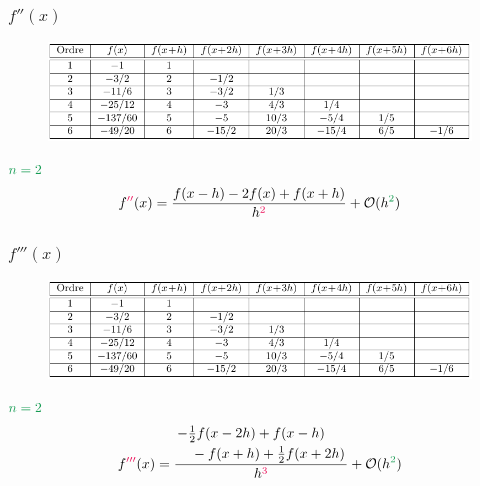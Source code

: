 \documentclass[]{article}
\begin{document}
\begin{multicols}{3}
\subsubsection{$f''(x)$}
\begin{figure}[H]
\centering
\includegraphics[width=\columnwidth,page=6]{diff_finies_tableaux.pdf}
\end{figure}
$\textcolor{ForestGreen}{n=2}$
$$f\textcolor{OrangeRed}{''}(x)=\frac{f(x-h)-2f(x)+f(x+h)}{h^{\textcolor{OrangeRed}{2}}}+\mathcal{O}(h^{\textcolor{ForestGreen}{2}})$$
\subsubsection{$f'''(x)$}
\begin{figure}[H]
\centering
\includegraphics[width=\columnwidth,page=7]{diff_finies_tableaux.pdf}
\end{figure}
$\textcolor{ForestGreen}{n=2}$
$$f\textcolor{OrangeRed}{'''}(x)=\frac{\splitdfrac{-\frac{1}{2}f(x-2h)+f(x-h)}{-f(x+h)+\frac{1}{2}f(x+2h)}}{h^{\textcolor{OrangeRed}{3}}}+\mathcal{O}(h^{\textcolor{ForestGreen}{2}})$$



\end{multicols}
\end{document}
